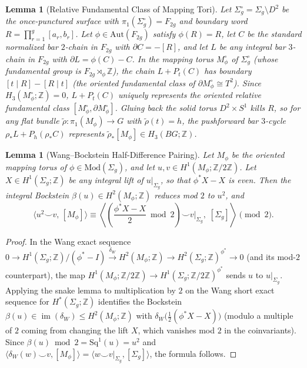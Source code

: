 \documentclass[11pt]{amsart}
\newtheorem{lemma}[theorem]{Lemma}
\theoremstyle{definition}
\theoremstyle{remark}
\newcommand{\Z}{\mathbb{Z}}
\newcommand{\Mod}{\mathrm{Mod}}
\newcommand{\Aut}{\mathrm{Aut}}
\begin{document}
\begin{lemma}[Relative Fundamental Class of Mapping Tori]\label{lem:rel}
Let $\Sigma_g^\circ = \Sigma_g \setminus D^2$ be the once-punctured surface with $\pi_1(\Sigma_g^\circ) = F_{2g}$ and boundary word $R = \prod_{r=1}^g [a_r,b_r]$.
Let $\phi\in \Aut(F_{2g})$ satisfy $\phi(R)=R$, let $C$ be the standard normalized bar $2$-chain in $F_{2g}$ with $\partial C = -[R]$, and let $L$ be any integral bar $3$-chain in $F_{2g}$ with $\partial L = \phi(C)-C$.
In the mapping torus $M_\phi^\circ$ of $\Sigma_g^\circ$ (whose fundamental group is $F_{2g}\rtimes_\phi\Z$), the chain $L + P_t(C)$ has boundary $[t\mid R]-[R\mid t]$ (the oriented fundamental class of $\partial M_\phi^\circ \cong T^2$).
Since $H_3(M_\phi^\circ;\Z) = 0$, $L + P_t(C)$ uniquely represents the oriented relative fundamental class $[M_\phi^\circ, \partial M_\phi^\circ]$.
Gluing back the solid torus $D^2 \times S^1$ kills $R$, so for any flat bundle $\tilde{\rho}\colon \pi_1(M_\phi)\to G$ with $\tilde{\rho}(t)=h$, the pushforward bar $3$-cycle $\rho_*L + P_h(\rho_*C)$ represents $\tilde{\rho}_*[M_\phi] \in H_3(BG;\Z)$.
\end{lemma}

\begin{lemma}[Wang--Bockstein Half-Difference Pairing]\label{lem:wang}
Let $M_\phi$ be the oriented mapping torus of $\phi\in\Mod(\Sigma_g)$, and let $u,v\in H^1(M_\phi;\Z/2\Z)$.
Let $X\in H^1(\Sigma_g;\Z)$ be any integral lift of $u|_{\Sigma_g}$, so that $\phi^*X - X$ is even.
Then the integral Bockstein $\beta(u)\in H^2(M_\phi;\Z)$ reduces mod $2$ to $u^2$, and
\[
    \langle u^2 \smile v,\, [M_\phi]\rangle \equiv \left\langle \left(\frac{\phi^*X - X}{2}\bmod 2\right) \smile v|_{\Sigma_g},\; [\Sigma_g]\right\rangle \pmod 2.
\]
\end{lemma}
\begin{proof}
In the Wang exact sequence $0 \to H^1(\Sigma_g;\Z)/(\phi^*-I) \xrightarrow{\delta_W} H^2(M_\phi;\Z) \to H^2(\Sigma_g;\Z)^{\phi^*}\to 0$ (and its mod-$2$ counterpart), the map $H^1(M_\phi;\Z/2\Z) \to H^1(\Sigma_g;\Z/2\Z)^{\phi^*}$ sends $u$ to $u|_{\Sigma_g}$.
Applying the snake lemma to multiplication by $2$ on the Wang short exact sequence for $H^*(\Sigma_g;\Z)$ identifies the Bockstein $\beta(u) \in \operatorname{im}(\delta_W) \le H^2(M_\phi;\Z)$ with $\delta_W\bigl(\tfrac{1}{2}(\phi^*X-X)\bigr)$ (modulo a multiple of $2$ coming from changing the lift $X$, which vanishes mod $2$ in the coinvariants).
Since $\beta(u)\bmod 2 = \mathrm{Sq}^1(u) = u^2$ and $\langle \delta_W(w)\smile v, [M_\phi]\rangle = \langle w \smile v|_{\Sigma_g}, [\Sigma_g]\rangle$, the formula follows.
\end{proof}
\end{document}
